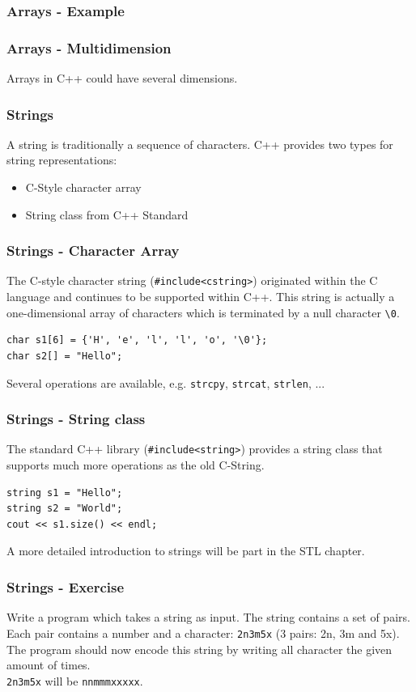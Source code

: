 \begin{frame}[fragile]
\frametitle{Arrays - Example}

\end{frame}

\begin{frame}[fragile]
\frametitle{Arrays - Multidimension}
Arrays in C++ could have several dimensions.

\end{frame}

\begin{frame}[fragile]
\frametitle{Strings}
A string is traditionally a sequence of characters. C++ provides two types for string representations:
\begin{itemize}
\item C-Style character array
\item String class from C++ Standard
\end{itemize}
\end{frame}

\begin{frame}[fragile]
\frametitle{Strings - Character Array}
The C-style character string (\verb|#include<cstring>|) originated within the C language and continues to be supported within C++.
This string is actually a one-dimensional array of characters which is terminated by a null
character \verb|\0|.
\begin{lstlisting}
char s1[6] = {'H', 'e', 'l', 'l', 'o', '\0'};
char s2[] = "Hello";
\end{lstlisting}
Several operations are available, e.g. \verb|strcpy|, \verb|strcat|, \verb|strlen|, ...
\end{frame}

\begin{frame}[fragile]
\frametitle{Strings - String class}
The standard C++ library (\verb|#include<string>|) provides a string class that supports much more operations
as the old C-String.
\begin{lstlisting}
string s1 = "Hello";
string s2 = "World";
cout << s1.size() << endl;
\end{lstlisting}
A more detailed introduction to strings will be part in the STL chapter.
\end{frame}

\begin{frame}[fragile]
\frametitle{Strings - Exercise}
\begin{exercise}
Write a program which takes a string as input. The string contains a set of pairs. Each
pair contains a number and a character: \verb|2n3m5x| (3 pairs: 2n, 3m and 5x).\\
The program should now encode this string by writing all character the given amount
of times.\\
\verb|2n3m5x| will be \verb|nnmmmxxxxx|.
\end{exercise}
\end{frame}

